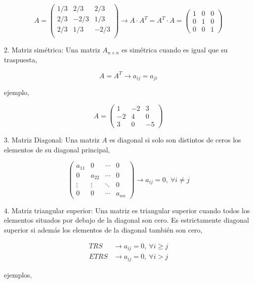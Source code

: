 \begin{equation*}
A=\begin{pmatrix}
1/3& 2/3& 2/3\\
2/3& -2/3& 1/3\\
2/3& 1/3& -2/3\\
\end{pmatrix} \rightarrow A\cdot A^T =A^T\cdot A= \begin{pmatrix}
1& 0& 0\\
0& 1& 0\\
0& 0& 1
\end{pmatrix}
\end{equation*}
\begin{paracol}{2}
2. Matriz simétrica: Una matriz $A_{n\times n}$ es simétrica cuando es igual que su traspuesta,
\end{paracol}
\begin{equation*}
A=A^T \rightarrow a_{ij}=a_{ji}
\end{equation*}
\begin{paracol}{2}
ejemplo,
\end{paracol}
\begin{equation*}
A=\begin{pmatrix}
1& -2& 3\\
-2& 4& 0\\
3& 0& -5
\end{pmatrix}
\end{equation*}
\begin{paracol}{2}
3. Matriz Diagonal: Una matriz $A$  es diagonal si solo son distintos de ceros los elementos de su diagonal principal,
\end{paracol}

\begin{equation*}
\begin{pmatrix}
a_{11}& 0& \cdots & 0\\
0& a_{22}& \cdots & 0\\
\vdots & \vdots & \ddots & 0\\
0& 0& \cdots & a_{nn}
\end{pmatrix} \rightarrow
a_{ij}=0,\ \forall i\neq j
\end{equation*}

\begin{paracol}{2}
4. Matriz triangular superior: Una matriz es triangular superior cuando todos los elementos situados por debajo de la diagonal son cero. Es estrictamente diagonal superior si además los elementos de la diagonal también son cero,
\end{paracol}
\begin{align*}
TRS& \rightarrow a_{ij} = 0, \ \forall i\geq j \\
ETRS& \rightarrow a_{ij} = 0, \ \forall i > j 
\end{align*}
\begin{paracol}{2}
ejemplos,
\end{paracol}

